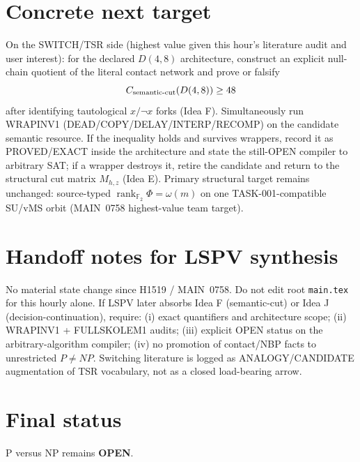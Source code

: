 \documentclass[11pt]{article}
\begin{document}
\section*{Concrete next target}
On the SWITCH/TSR side (highest value given this hour's literature audit and user interest):
for the declared $D(4,8)$ architecture, construct an explicit null-chain quotient of the
literal contact network and prove or falsify
\[
C_{\rm semantic\textrm{-}cut}(D(4,8))\ge 48
\]
after identifying tautological $x/\neg x$ forks (Idea F). Simultaneously run WRAPINV1
(DEAD/COPY/DELAY/INTERP/RECOMP) on the candidate semantic resource.
If the inequality holds and survives wrappers, record it as PROVED/EXACT inside the
architecture and state the still-OPEN compiler to arbitrary SAT; if a wrapper destroys it,
retire the candidate and return to the structural cut matrix $M_{h,z}$ (Idea E).
Primary structural target remains unchanged: source-typed
$\operatorname{rank}_{\mathbb F_2}\Phi=\omega(m)$ on one TASK-001-compatible SU/vMS orbit
(MAIN~0758 highest-value team target).

\section*{Handoff notes for LSPV synthesis}
No material state change since H1519 / MAIN~0758. Do not edit root \texttt{main.tex} for this
hourly alone. If LSPV later absorbs Idea F (semantic-cut) or Idea J (decision-continuation),
require: (i) exact quantifiers and architecture scope; (ii) WRAPINV1 + FULLSKOLEM1 audits;
(iii) explicit OPEN status on the arbitrary-algorithm compiler; (iv) no promotion of
contact/NBP facts to unrestricted $P\neq NP$. Switching literature is logged as
ANALOGY/CANDIDATE augmentation of TSR vocabulary, not as a closed load-bearing arrow.

\section*{Final status}
P versus NP remains \textbf{OPEN}.

\end{document}
